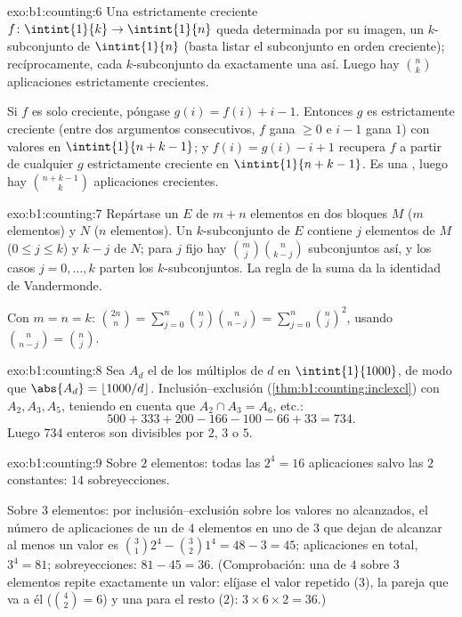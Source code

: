\begin{solution}{exo:b1:counting:6}
Una  estrictamente creciente
$f \colon \intint{1}{k} \to \intint{1}{n}$ queda determinada por su
imagen, un $k$-subconjunto de $\intint{1}{n}$ (basta listar el
subconjunto en orden creciente); recíprocamente, cada $k$-subconjunto da
exactamente una  así. Luego hay $\binom nk$ aplicaciones
estrictamente crecientes.

Si $f$ es solo creciente, póngase $g(i) = f(i) + i - 1$. Entonces $g$ es
estrictamente creciente (entre dos argumentos consecutivos, $f$ gana
$\geq 0$ e $i - 1$ gana $1$) con valores en $\intint{1}{n + k - 1}$; y
$f(i) = g(i) - i + 1$ recupera $f$ a partir de cualquier $g$
estrictamente creciente en $\intint{1}{n+k-1}$. Es una , luego
hay $\binom{n + k - 1}{k}$ aplicaciones crecientes.
\end{solution}

\begin{solution}{exo:b1:counting:7}
Repártase un  $E$ de $m + n$ elementos en dos bloques $M$ ($m$
elementos) y $N$ ($n$ elementos). Un $k$-subconjunto de $E$ contiene $j$
elementos de $M$ ($0 \leq j \leq k$) y $k - j$ de $N$; para $j$ fijo hay
$\binom mj \binom{n}{k-j}$ subconjuntos así, y los casos
$j = 0, \dots, k$ parten los $k$-subconjuntos. La regla de la suma da la
identidad de Vandermonde.

Con $m = n = k$: $\binom{2n}{n} = \sum_{j=0}^{n} \binom nj
\binom{n}{n-j} = \sum_{j=0}^{n} \binom nj^2$, usando
$\binom{n}{n-j} = \binom nj$.
\end{solution}

\begin{solution}{exo:b1:counting:8}
Sea $A_d$ el  de los múltiplos de $d$ en $\intint{1}{1000}$, de
modo que $\abs{A_d} = \lfloor 1000/d \rfloor$. Inclusión--exclusión
(\cref{thm:b1:counting:inclexcl}) con $A_2, A_3, A_5$, teniendo en
cuenta que $A_2 \cap A_3 = A_6$, etc.:
\[
500 + 333 + 200 - 166 - 100 - 66 + 33 = 734 .
\]
Luego $734$ enteros son divisibles por $2$, $3$ o $5$.
\end{solution}

\begin{solution}{exo:b1:counting:9}
Sobre $2$ elementos: todas las $2^4 = 16$ aplicaciones salvo las $2$
constantes: $14$ sobreyecciones.

Sobre $3$ elementos: por inclusión--exclusión sobre los valores no
alcanzados, el número de aplicaciones de un  de $4$ elementos en
uno de $3$ que dejan de alcanzar al menos un valor es
$\binom 31 2^4 - \binom 32 1^4 = 48 - 3 = 45$; aplicaciones en total,
$3^4 = 81$; sobreyecciones: $81 - 45 = 36$. (Comprobación: una
 de $4$ sobre $3$ elementos repite exactamente un valor:
elíjase el valor repetido ($3$), la pareja que va a él ($\binom 42 = 6$)
y una  para el resto ($2$): $3 \times 6 \times 2 = 36$.)
\end{solution}

